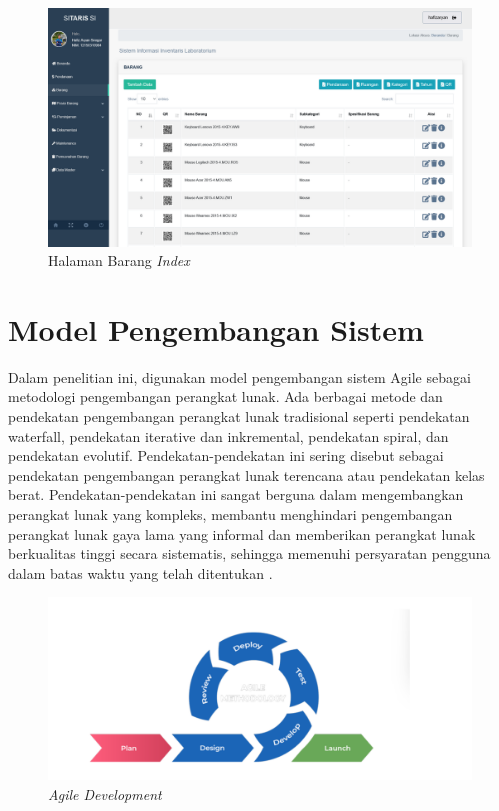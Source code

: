 \begin{enumerate}
	      \begin{figure}
		      \centering
		      \includegraphics[width=0.82\linewidth]{konten//gambar/barang.png}
		      \caption{Halaman Barang \textit{Index}}
		      \label{fig:enter-label}
	      \end{figure}

\end{enumerate}

\section{Model Pengembangan Sistem}
Dalam penelitian ini, digunakan model pengembangan sistem Agile sebagai metodologi pengembangan perangkat lunak. Ada berbagai metode dan pendekatan pengembangan perangkat lunak tradisional seperti pendekatan waterfall, pendekatan iterative dan inkremental, pendekatan spiral, dan pendekatan evolutif. Pendekatan-pendekatan ini sering disebut sebagai pendekatan pengembangan perangkat lunak terencana atau pendekatan kelas berat. Pendekatan-pendekatan ini sangat berguna dalam mengembangkan perangkat lunak yang kompleks, membantu menghindari pengembangan perangkat lunak gaya lama yang informal dan memberikan perangkat lunak berkualitas tinggi secara sistematis, sehingga memenuhi persyaratan pengguna dalam batas waktu yang telah ditentukan \cite{al2020agile}.

\begin{figure}
	\centering
	\includegraphics[width=0.82\linewidth]{konten//gambar/agile.png}
	\caption{\textit{Agile Development}}
	\label{fig:enter-label}
\end{figure}

